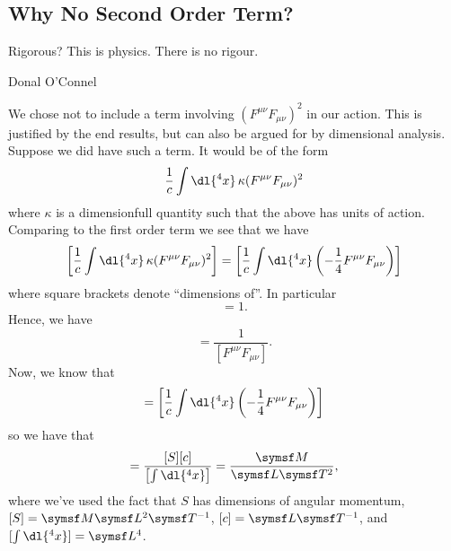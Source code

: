 \subsection{Why No Second Order Term?}
\epigraph{Rigorous? This is physics. There is no rigour.}{Donal O'Connel}
We chose not to include a term involving \((F^{\mu\nu}F_{\mu\nu})^2\) in our action.
This is justified by the end results, but can also be argued for by dimensional analysis.
Suppose we did have such a term.
It would be of the form
\begin{equation}
    \frac{1}{c} \int \dl{^4x} \, \kappa(F^{\mu\nu}F_{\mu\nu})^2
\end{equation}
where \(\kappa\) is a dimensionfull quantity such that the above has units of action.
Comparing to the first order term we see that we have
\begin{equation}
    \left[ \frac{1}{c} \int \dl{^4x} \, \kappa(F^{\mu\nu}F_{\mu\nu})^2 \right] = \left[ \frac{1}{c} \int \dl{^4x} \left( -\frac{1}{4}F^{\mu\nu}F_{\mu\nu} \right) \right]
\end{equation}
where square brackets denote \enquote{dimensions of}.
In particular
\begin{equation}
    [\kappa F^{\mu\nu}F_{\mu\nu}] = 1.
\end{equation}
Hence, we have
\begin{equation}
    [\kappa] = \frac{1}{[F^{\mu\nu}F_{\mu\nu}]}.
\end{equation}
Now, we know that
\begin{equation}
    [S] = \left[ \frac{1}{c} \int \dl{^4x} \left( -\frac{1}{4}F^{\mu\nu}F_{\mu\nu} \right) \right]
\end{equation}
so we have that
\begin{equation}
    [F^{\mu\nu}F_{\mu\nu}] = \frac{[S][c]}{\left[ \int \dl{^4x} \right]} = \frac{\dimension{M}}{\dimension{L}\dimension{T}^2},
\end{equation}
where we've used the fact that \(S\) has dimensions of angular momentum, \([S] = \dimension{M}\dimension{L}^2\dimension{T}^{-1}\), \([c] = \dimension{L}\dimension{T}^{-1}\), and \([\int \dl{^4x}] = \dimension{L}^4\).


